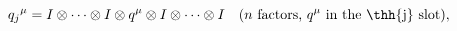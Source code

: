 \begin{equation}
\label{ind_coord}
{q_j}^\mu=I\otimes\dotsm\otimes I\otimes q^\mu\otimes I
\otimes \dotsm\otimes I\quad
\text{($n$ factors, $q^\mu$ in the \thh{j}\ slot)},
\end{equation}


